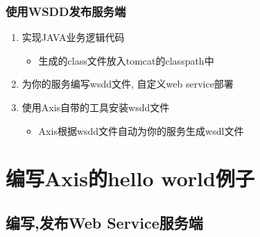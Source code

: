 \documentclass[CJKutf8,compress,hyperref]{beamer}
\begin{document}
\begin{CJK}{UTF8}{song}
        \begin{frame}
                \frametitle{使用WSDD发布服务端}
                \begin{enumerate}
                        \item 实现JAVA业务逻辑代码
                                \begin{itemize}
                                        \item 生成的class文件放入tomcat的classpath中
                                \end{itemize}
                        \item 为你的服务编写wsdd文件, 自定义web service部署
                        \item 使用Axis自带的工具安装wsdd文件
                                \begin{itemize}
                                        \item Axis根据wsdd文件自动为你的服务生成wsdl文件
                                \end{itemize}
                \end{enumerate}  
        \end{frame} 

        \section{编写Axis的hello world例子}
        \subsection{编写,发布Web Service服务端}


\end{CJK}
\end{document}
